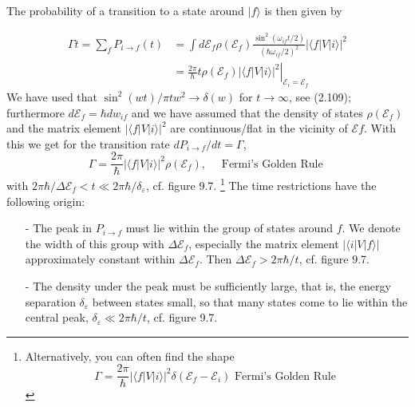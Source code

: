 The probability of a transition to a state around $|f\rangle$ is then given by

\begin{equation}
\begin{aligned} \Gamma t=\sum_{f} P_{i \rightarrow f}(t) &=\int d \mathcal{E}_{f} \rho\left(\mathcal{E}_{f}\right) \frac{\sin ^{2}\left(\omega_{i f} t / 2\right)}{\left(\hbar \omega_{i f} / 2\right)^{2}}|\langle f|V| i\rangle|^{2} \\ &=\left.\frac{2 \pi}{\hbar} t \rho\left(\mathcal{E}_{f}\right)|\langle f|V| i\rangle|^{2}\right|_{\mathcal{E}_{i}=\mathcal{E}_{f}} \end{aligned}
\end{equation}
We have used that $\operatorname{sin}^2(wt)/\pi tw^2\rightarrow\delta(w)$ for $t\rightarrow\infty$, see (2.109); furthermore $d\mathcal{E}_f=\hbar dw_{if}$ and we have assumed that the density of states $\rho(\mathcal{E}_f)$ and the matrix element $|\langle f|V|i\rangle|^2$ are continuous/flat in the vicinity of $\mathcal{E}f$. With this we get for the transition rate $dP_{i\rightarrow f}/dt=\Gamma$,
\begin{equation}
    \Gamma=\frac{2 \pi}{\hbar}|\langle f|V| i\rangle|^{2} \rho\left(\mathcal{E}_{f}\right), \quad \text { Fermi's Golden Rule }
    \end{equation}
with $2\pi\hbar/\Delta\mathcal{E}_f<t\ll 2\pi\hbar/\delta_{\varepsilon}$, cf. figure 9.7. \footnote{Alternatively, you can often find the shape\begin{equation}
    \Gamma=\frac{2 \pi}{\hbar}|\langle f|V| i\rangle|^{2} \delta\left(\mathcal{E}_{f}-\mathcal{E}_{i}\right) \text { Fermi's Golden Rule }
    \end{equation}} The time restrictions have the following origin:
\begin{enumerate}
    \item[-] The peak in $P_{i \rightarrow f}$ must lie within the group of states around $f$. We denote the width of this group with $\Delta\mathcal{E}_f$, especially the matrix element $| \langle i | V | f\rangle |$ approximately constant within $\Delta\mathcal{E}_f$. Then $\Delta\mathcal{E}_f>2\pi\hbar/t$, cf. figure 9.7.
    \item[-] The density under the peak must be sufficiently large, that is, the energy separation $\delta_{\varepsilon}$ between states small, so that many states come to lie within the central peak, $\delta_{\varepsilon}\ll 2\pi\hbar/t$, cf. figure 9.7. 
\end{enumerate}


